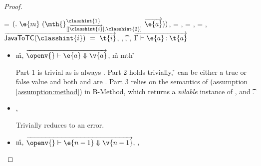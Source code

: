 \begin{lemma}
\begin{proof}
\begin{case}[T-FieldStatic]
\begin{itemize}
\begin{subcase}[BE-Field]
\end{subcase}

\end{itemize}
\end{case}

\begin{case}[T-MethodStatic]
  \e{} = ${\methodstaticexp {\classhint{1}} 
                          {\overrightarrow {\classhint{i}}} 
                          {\classhint{2}}
                          {\mth{}} {\e{m}} {\overrightarrow{\e{a}}}}$,
  \thenprop{\prop{}} = \topprop{}, \elseprop{\prop{}} = \topprop{}, \object{} = \emptyobject{},
  $\overrightarrow{\javatotc {\classhint{i}} {\t{i}}}$,
              {\class{}},
              {\t{}},
  \judgementtwo {\propenv{}} { {\class{}}},
             $\overrightarrow{
  \judgementtwo {\propenv{}} {\hastype {\e{a}} {\t{a}}}
                  }$

\begin{itemize}
  \item[]
\begin{subcase}[B-Method]
  \opsem {\openv{}}
         {}
         {\v{m}},
  $\overrightarrow{
  \opsem {\openv{}}
         {\e{a}}
         {\v{a}}}$,
   {\v{m}} {mth}
                    {} {}
                    {}
                    {\v{}}


Part 1 is trivial as \object{} is always \emptyobject{}.
Part 2 holds trivially, \v{} can be either a true or false value
and both {\thenprop{\prop{}}} and {\elseprop{\prop{}}}
are \topprop{}.
Part 3 relies on the semantics of \invokejavamethodliteral (assumption \ref{assumption:method})
in B-Method, which returns a \emph{nilable} instance of ,
and  {\t{}}.
\end{subcase}

  \item[]
\begin{subcase}[BE-Method1]
  \opsem {\openv{}}
         {}
         {\errorval{\v{}}},
  \opsem {\openv{}}
         {\e{}}
         {\errorval{\v{}}}

         Trivially reduces to an error.
\end{subcase}
  \item[]
\begin{subcase}[BE-Method2]
  \opsem {\openv{}}
         {}
         {\v{m}},
 $\overrightarrow{
  \opsem {\openv{}}
         {\e{n-1}}
         {\v{n-1}}
       }$,
  \opsem {\openv{}}
         {}
         {\errorval{\v{}}},
  \opsem {\openv{}}
         {\e{}}
         {\errorval{\v{}}}


\end{subcase}
\end{itemize}
\end{case}
\end{proof}
\end{lemma}
